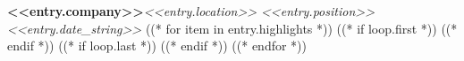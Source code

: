 \resumeSubheading
    {\textbf{<<entry.company>>}}{\textit{<<entry.location>>}}
    {\textit{<<entry.position>>}}{\textit{<<entry.date_string>>}}
((* for item in entry.highlights *))
    ((* if loop.first *))
    \resumeItemListStart
    ((* endif *))
    ((* if loop.last *))
    \resumeItemListEnd
    ((* endif *))
((* endfor *))